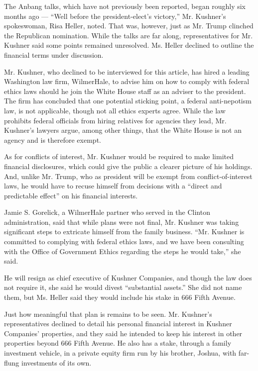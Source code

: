 The Anbang talks, which have not previously been reported, began roughly
six months ago --- ``Well before the president-elect's victory,'' Mr.
Kushner's spokeswoman, Risa Heller, noted. That was, however, just as
Mr. Trump clinched the Republican nomination. While the talks are far
along, representatives for Mr. Kushner said some points remained
unresolved. Ms. Heller declined to outline the financial terms under
discussion.

Mr. Kushner, who declined to be interviewed for this article, has hired
a leading Washington law firm, WilmerHale, to advise him on how to
comply with federal ethics laws should he join the White House staff as
an adviser to the president. The firm has concluded that one potential
sticking point, a federal anti-nepotism law, is not applicable, though
not all ethics experts agree. While the law prohibits federal officials
from hiring relatives for agencies they lead, Mr. Kushner's lawyers
argue, among other things, that the White House is not an agency and is
therefore exempt.

As for conflicts of interest, Mr. Kushner would be required to make
limited financial disclosures, which could give the public a clearer
picture of his holdings. And, unlike Mr. Trump, who as president will be
exempt from conflict-of-interest laws, he would have to recuse himself
from decisions with a ``direct and predictable effect'' on his financial
interests.

Jamie S. Gorelick, a WilmerHale partner who served in the Clinton
administration, said that while plans were not final, Mr. Kushner was
taking significant steps to extricate himself from the family business.
``Mr. Kushner is committed to complying with federal ethics laws, and we
have been consulting with the Office of Government Ethics regarding the
steps he would take,'' she said.

He will resign as chief executive of Kushner Companies, and though the
law does not require it, she said he would divest ``substantial
assets.'' She did not name them, but Ms. Heller said they would include
his stake in 666 Fifth Avenue.

Just how meaningful that plan is remains to be seen. Mr. Kushner's
representatives declined to detail his personal financial interest in
Kushner Companies' properties, and they said he intended to keep his
interest in other properties beyond 666 Fifth Avenue. He also has a
stake, through a family investment vehicle, in a private equity firm run
by his brother, Joshua, with far-flung investments of its own.

